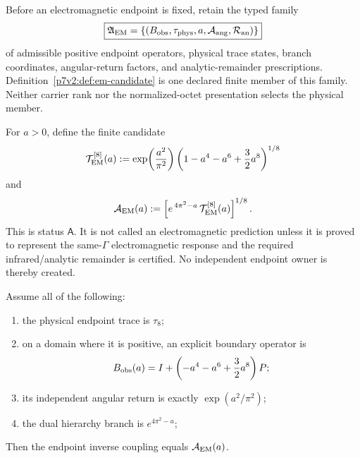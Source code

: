 \documentclass[12pt,a4paper]{article}
\newcommand{\Aem}{\mathcal A_{\rm EM}}
\begin{document}
\begin{definition}
\label{p7v2:def:em-selector-family}
Before an electromagnetic endpoint is fixed, retain the typed family
\[
 \boxed{
 \mathfrak A_{\rm EM}
 =\{(B_{\rm obs},\tau_{\rm phys},a,\mathcal A_{\rm ang},\mathcal R_{\rm an})\}
 }
\]
of admissible positive endpoint operators, physical trace states, branch
coordinates, angular-return factors, and analytic-remainder prescriptions.
Definition~\ref{p7v2:def:em-candidate} is one declared finite member of this
family.  Neither carrier rank nor the normalized-octet presentation selects the
physical member.
\end{definition}

\begin{definition}
\label{p7v2:def:em-candidate}
For \(a>0\), define the finite candidate
\begin{equation}
\label{p7v2:eq:em-transport-candidate}
 \mathcal T_{\rm EM}^{[8]}(a)
 :=
 \exp\!\left(\frac{a^2}{\pi^2}\right)
 \left(1-a^4-a^6+\frac32a^8\right)^{1/8}
\end{equation}
and
\begin{equation}
\label{p7v2:eq:alpha-em-candidate}
 \Aem(a)
 :=
 \left[
   e^{\,4\pi^2-a}\,
   \mathcal T_{\rm EM}^{[8]}(a)
 \right]^{1/8}.
\end{equation}
This is status \(\mathsf A\).  It is not called an electromagnetic
prediction unless it is proved to represent the same-$\Gamma$ electromagnetic
response and the required infrared/analytic remainder is certified.  No
independent endpoint owner is thereby created.
\end{definition}

\begin{proposition}
\label{p7v2:prop:em-candidate-conditional}
Assume all of the following:
\begin{enumerate}[label=(\roman*),leftmargin=2.5em]
  \item the physical endpoint trace is \(\tau_8\);
  \item on a domain where it is positive, an explicit boundary operator is
  \[
    B_{\rm obs}(a)
    =
    I+\left(-a^4-a^6+\frac32a^8\right)P;
  \]
  \item its independent angular return is exactly
  \(\exp(a^2/\pi^2)\);
  \item the dual hierarchy branch is \(e^{4\pi^2-a}\);
\end{enumerate}
Then the endpoint inverse coupling equals \(\Aem(a)\).
\end{proposition}
\end{document}
